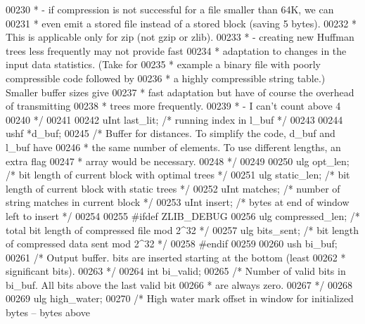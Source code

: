 \begin{DoxyCode}
00230 \textcolor{comment}{     *   - if compression is not successful for a file smaller than 64K, we can}
00231 \textcolor{comment}{     *     even emit a stored file instead of a stored block (saving 5 bytes).}
00232 \textcolor{comment}{     *     This is applicable only for zip (not gzip or zlib).}
00233 \textcolor{comment}{     *   - creating new Huffman trees less frequently may not provide fast}
00234 \textcolor{comment}{     *     adaptation to changes in the input data statistics. (Take for}
00235 \textcolor{comment}{     *     example a binary file with poorly compressible code followed by}
00236 \textcolor{comment}{     *     a highly compressible string table.) Smaller buffer sizes give}
00237 \textcolor{comment}{     *     fast adaptation but have of course the overhead of transmitting}
00238 \textcolor{comment}{     *     trees more frequently.}
00239 \textcolor{comment}{     *   - I can't count above 4}
00240 \textcolor{comment}{     */}
00241 
00242     uInt last\_lit;      \textcolor{comment}{/* running index in l\_buf */}
00243 
00244     ushf *d\_buf;
00245     \textcolor{comment}{/* Buffer for distances. To simplify the code, d\_buf and l\_buf have}
00246 \textcolor{comment}{     * the same number of elements. To use different lengths, an extra flag}
00247 \textcolor{comment}{     * array would be necessary.}
00248 \textcolor{comment}{     */}
00249 
00250     ulg opt\_len;        \textcolor{comment}{/* bit length of current block with optimal trees */}
00251     ulg static\_len;     \textcolor{comment}{/* bit length of current block with static trees */}
00252     uInt matches;       \textcolor{comment}{/* number of string matches in current block */}
00253     uInt insert;        \textcolor{comment}{/* bytes at end of window left to insert */}
00254 
00255 \textcolor{preprocessor}{#ifdef ZLIB\_DEBUG}
00256     ulg compressed\_len; \textcolor{comment}{/* total bit length of compressed file mod 2^32 */}
00257     ulg bits\_sent;      \textcolor{comment}{/* bit length of compressed data sent mod 2^32 */}
00258 \textcolor{preprocessor}{#endif}
00259 
00260     ush bi\_buf;
00261     \textcolor{comment}{/* Output buffer. bits are inserted starting at the bottom (least}
00262 \textcolor{comment}{     * significant bits).}
00263 \textcolor{comment}{     */}
00264     \textcolor{keywordtype}{int} bi\_valid;
00265     \textcolor{comment}{/* Number of valid bits in bi\_buf.  All bits above the last valid bit}
00266 \textcolor{comment}{     * are always zero.}
00267 \textcolor{comment}{     */}
00268 
00269     ulg high\_water;
00270     \textcolor{comment}{/* High water mark offset in window for initialized bytes -- bytes above}

\end{DoxyCode}
